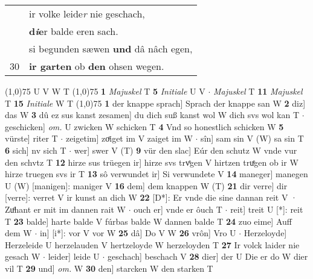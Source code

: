\documentclass[8pt,a4paper,notitlepage]{article}
\begin{document}
\begin{table}[ht]
\begin{minipage}[t]{0.5\linewidth}
\begin{tabular}{rl}
 & ir volke leide\textit{r} nie geschach,\\ 
 & \textbf{d\textit{i}e}r balde eren sach.\\ 
 & si begunden sæwen \textbf{und} dâ nâch egen,\\ 
30 & \textbf{ir garten} ob \textbf{den} ohsen wegen.\\ 
\end{tabular}
\scriptsize
\line(1,0){75} \newline
U V W T \newline
\line(1,0){75} \newline
\textbf{1} \textit{Majuskel} T  \textbf{5} \textit{Initiale} U V   $\cdot$ \textit{Majuskel} T  \textbf{11} \textit{Majuskel} T  \textbf{15} \textit{Initiale} W T  \newline
\line(1,0){75} \newline
\textbf{1} der knappe sprach] Sprach der knappe san W \textbf{2} diz] das W \textbf{3} dû ez sus kanst zesamen] du dich suß kanst wol W dich svs wol kan T  $\cdot$ geschicken] \textit{om.} U zwicken W schicken T \textbf{4} Vnd so honestlich schicken W \textbf{5} vürste] riter T  $\cdot$ zeigetim] zoͤiget im V zaiget im W  $\cdot$ sîn] sam sin V (W) sa sin T \textbf{6} sich] nv sich T  $\cdot$ wer] swer V (T) \textbf{9} vür den slac] Eúr den schutz W vnde vur den schvtz T \textbf{12} hirze sus trüegen ir] hirze svs trvͤgen V hirtzen truͤgen ob ir W hirze truegen svs ir T \textbf{13} sô verwundet ir] Si verwundete V \textbf{14} maneger] manegen U (W) [manigen]: maniger  V \textbf{16} dem] dem knappen W (T) \textbf{21} dir verre] dir [verre]: verret V ir kunst an dich W \textbf{22} [D*]: Er vnde die sine dannan reit V · Zuͦhant er mit im dannen rait W  $\cdot$ ouch er] vnde er ôuch T  $\cdot$ reit] treit U [*]: reit T \textbf{23} balde] harte balde V fúrbas balde W dannen balde T \textbf{24} zuo eime] Auff dem W  $\cdot$ in] [i*]: vor V vor W \textbf{25} dâ] Do V W \textbf{26} vrôn] Vro U  $\cdot$ Herzeloyde] Herzeleide U herzelauden V hertzeloyde W herzeloyden T \textbf{27} Ir volck laider nie gesach W  $\cdot$ leider] leide U  $\cdot$ geschach] beschach V \textbf{28} dier] der U Die er do W dier vil T \textbf{29} und] \textit{om.} W \textbf{30} den] starcken W den starken T \newline
\end{minipage}
\end{table}
\end{document}
